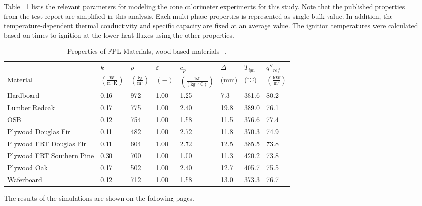 Table ~\ref{Properties_FPL_Wood_Materials_woods} lists the relevant parameters for modeling the cone calorimeter experiments for this study.
Note that the published properties from the test report are simplified in this analysis. Each multi-phase properties is represented as single bulk value. 
In addition, the temperature-dependent thermal conductivity and specific capacity are fixed at an average value. 
The ignition temperatures were calculated based on times to ignition at the lower heat fluxes using the other properties.

\begin{table}[!h]
\caption[Properties of FPL Materials, wood-based materials]{Properties of FPL Materials, wood-based materials ~\cite{FPL:Fire_Database}.}
\centering
\begin{tabular}{|p{5.5cm}|p{1.0cm}|p{1.0cm}|p{0.8cm}|p{1.4cm}|p{1.0cm}|p{1.0cm}|p{1.2cm}|}
\hline
                                               & $k$    & $\rho$      & $\varepsilon$   & $c_{p}$ & $\Delta$    & $T_{ign}$ & $q''_{ref}$ \\
Material                                       & $\mathrm{\left(\frac{W}{m\cdot K}\right)}$ & $\mathrm{\left(\frac{kg}{m^{3}}\right)}$ & $\mathrm{( - )}$ & $\mathrm{\left(\frac{kJ}{(kg\cdot ^{\circ}C)}\right)}$ &  ($\mathrm{mm}$)   & ($\mathrm{^{\circ}C}$) & $\mathrm{\left(\frac{kW}{m^{2}}\right)}$ \\ \hline
\hline
Hardboard  & 0.16 & 972 & 1.00 & 1.25 & 7.3 & 381.6 & 80.2 \\ \hline 
Lumber Redoak  & 0.17 & 775 & 1.00 & 2.40 & 19.8 & 389.0 & 76.1 \\ \hline 
OSB  & 0.12 & 754 & 1.00 & 1.58 & 11.5 & 376.6 & 77.4 \\ \hline 
Plywood Douglas Fir  & 0.11 & 482 & 1.00 & 2.72 & 11.8 & 370.3 & 74.9 \\ \hline 
Plywood FRT Douglas Fir  & 0.11 & 604 & 1.00 & 2.72 & 12.5 & 385.5 & 73.8 \\ \hline 
Plywood FRT Southern Pine  & 0.30 & 700 & 1.00 & 1.00 & 11.3 & 420.2 & 73.8 \\ \hline 
Plywood Oak  & 0.17 & 502 & 1.00 & 2.40 & 12.7 & 405.7 & 75.5 \\ \hline 
Waferboard  & 0.12 & 712 & 1.00 & 1.58 & 13.0 & 373.3 & 76.7 \\ \hline 
\end{tabular}
\label{Properties_FPL_Wood_Materials_woods}
\end{table}

The results of the simulations are shown on the following pages.

